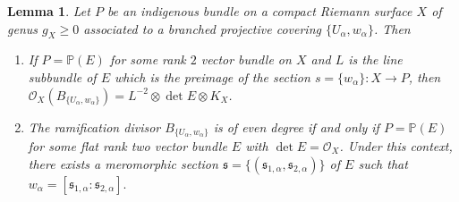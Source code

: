 \documentclass[12pt]{article}
\newtheorem{lem}{Lemma}[section]
\begin{document}
\begin{lem}
\label{lem:evendegree}
Let $P$ be an indigenous bundle on a compact Riemann surface $X$ of genus $g_{X} \geq 0$ associated to a branched projective covering $\{U_{\alpha}, w_{\alpha}\}$. Then
\begin{enumerate}
\item If $P = \mathbb P(E)$ for some rank $2$ vector bundle on $X$ and $L$ is the line subbundle of $E$ which is the preimage of the section $s = \{w_{\alpha}\} \colon X \to P$, then $\mathcal O_{X} \left(B_{\{U_{\alpha},w_{\alpha}\}}\right) = L^{-2} \otimes \det E \otimes K_{X}$.
\item The ramification divisor $B_{\{U_{\alpha},w_{\alpha}\}}$ is of even degree if and only if $P = \mathbb{P}(E)$ for some flat rank two vector bundle $E$ with $\det E = \mathcal{O}_X$. Under this context,  there exists a meromorphic section ${\mathfrak s} = \{({\mathfrak s}_{1, \alpha}, {\mathfrak s}_{2,\alpha})\}$ of $E$ such that $w_{\alpha} = [{\mathfrak s}_{1,\alpha}:{\mathfrak s}_{2,\alpha}].$
\end{enumerate}
\end{lem}
\end{document}
